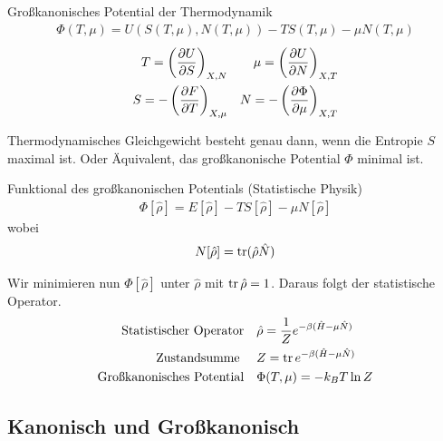 \begin{definition} Gro\ss{}kanonisches Potential der Thermodynamik
    \begin{align*}
      \Phi(T, \mu) = U\left( S (T, \mu), N(T, \mu) \right) - 
      T S(T, \mu)  - \mu N(T, \mu) 
    \end{align*}
    \begin{align*}
      T = \left( \frac{\partial U }{\partial S} \right)_{X, N} && \mu = \left( \frac{\partial  U }{\partial N} \right)_{X, T} \\
      S = - \left( \frac{\partial F }{\partial T} \right)_{X, \mu} && N = -\left( \frac{\partial \Phi }{\partial \mu} \right)_{X, T} \\
    \end{align*}
\end{definition}

%
\begin{postulat}
    Thermodynamisches Gleichgewicht besteht genau dann, wenn
    die Entropie $S$ maximal ist. Oder \"Aquivalent, das gro\ss{}kanonische
    Potential $\Phi$ minimal ist.
\end{postulat}

\begin{definition}
    Funktional des gro\ss{}kanonischen Potentials
    (Statistische Physik)
    \begin{align*}
        \Phi[\hat{\rho}] = E \left[ \hat{\rho} \right] - T S [\hat{\rho}]
        - \mu N[ \hat{\rho}]
    \end{align*}
    wobei %
    \begin{align*}
        N [\hat{\rho}] = \operatorname{tr} (\hat{\rho} \hat{N})
    \end{align*}
\end{definition}
        
Wir minimieren nun $\Phi[\hat{\rho}]$ unter $\hat{\rho}$ mit
$ \operatorname{tr} \hat{\rho} = 1$. Daraus folgt der statistische Operator.
%
\begin{align*}
    \text{Statistischer Operator} && & \hat{\rho} = \frac{1}{Z} 
    e^{- \beta (\hat{H} - \mu \hat{N})} \\
    \text{Zustandsumme } && & Z = \operatorname{tr} e^{-\beta (\hat{H} - \mu \hat{N})}  \\
    \text{Gro\ss{}kanonisches Potential}  && &
    \Phi (T, \mu) = -k_B T \ln{Z} 
\end{align*}
\subsection*{Kanonisch und Gro\ss{}kanonisch}

